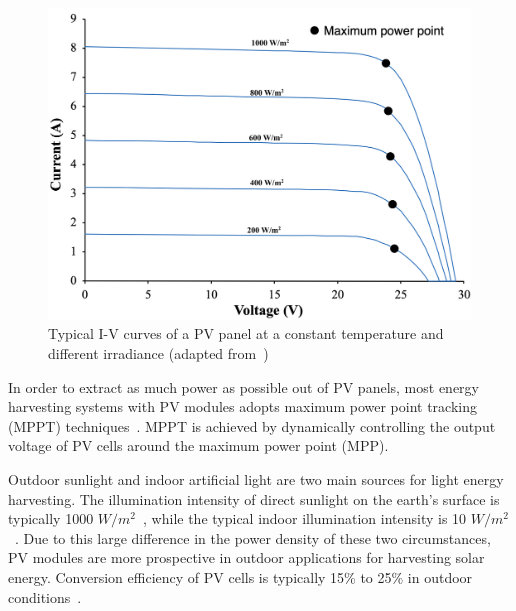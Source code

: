 \begin{figure}
    \centering
    \includegraphics[width=0.9\columnwidth]{ch2_review/figures/solar_iv_pic.png}
    \caption{Typical I-V curves of a PV panel at a constant temperature and different irradiance (adapted from~\cite{ciulla2014comparison})}
    \label{Figure:solar_vi}
\end{figure}

In order to extract as much power as possible out of PV panels, most energy harvesting systems with PV modules adopts maximum power point tracking (MPPT) techniques~\cite{lopez2010new, paz2016high, verma2016maximum}. MPPT is achieved by dynamically controlling the output voltage of PV cells around the maximum power point (MPP).

Outdoor sunlight and indoor artificial light are two main sources for light energy harvesting. The illumination intensity of direct sunlight on the earth's surface is typically 1000 $W/m^2$~\cite{roundy2004power}, while the typical indoor illumination intensity is 10 $W/m^2$~\cite{shaikh2016energy}. Due to this large difference in the power density of these two circumstances, PV modules are more prospective in outdoor applications for harvesting solar energy. Conversion efficiency of PV cells is typically 15\% to 25\% in outdoor conditions~\cite{mathuna2008energy}.  

